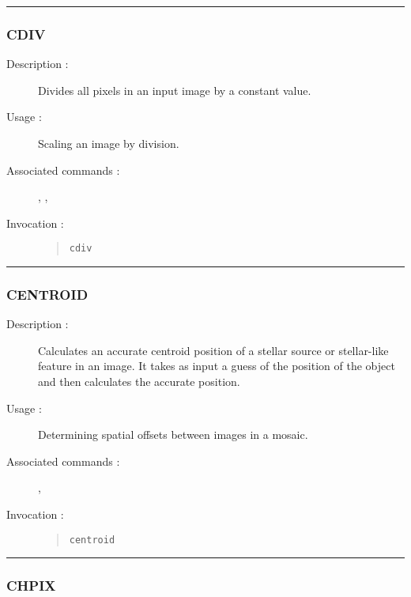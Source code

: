 \hrule
\subsubsection*{\label{CDIV}CDIV}

\begin{description}

\item[Description :] Divides all pixels in an input image by a constant value.

\item[Usage :] Scaling an image by division.

\item[Associated commands :] {\tt {}},
{\tt {}}, {\tt {}}

\item[Invocation :]

\begin{quote}{\tt cdiv }\end{quote}

\end{description}

\hrule
\subsubsection*{\label{CENTROID}CENTROID}

\begin{description}

\item[Description :] Calculates an accurate centroid
position of a stellar source or stellar-like feature in an image.  It
takes as input a guess of the position of the object and then
calculates the accurate position.

\item[Usage :] Determining spatial offsets between images in a mosaic.
\item[Associated commands :] {\tt {}},
{\tt {}}
\item[Invocation :]

\begin{quote}{\tt centroid }\end{quote}

\end{description}

\hrule
\subsubsection*{\label{CHPIX}CHPIX}

